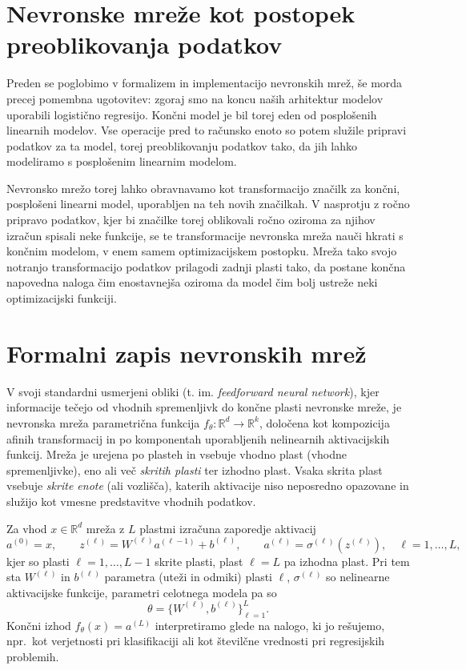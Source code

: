 \section{Nevronske mreže kot postopek preoblikovanja podatkov}

Preden se poglobimo v formalizem in implementacijo nevronskih mrež, še morda precej pomembna ugotovitev: zgoraj smo na koncu naših arhitektur modelov uporabili logistično regresijo. Končni model je bil torej eden od posplošenih linearnih modelov. Vse operacije pred to računsko enoto so potem služile pripravi podatkov za ta model, torej preoblikovanju podatkov tako, da jih lahko modeliramo s posplošenim linearnim modelom.

Nevronsko mrežo torej lahko obravnavamo kot transformacijo značilk za končni, posplošeni linearni model, uporabljen na teh novih značilkah. V nasprotju z ročno pripravo podatkov, kjer bi značilke torej oblikovali ročno oziroma za njihov izračun spisali neke funkcije, se te transformacije nevronska mreža nauči hkrati s končnim modelom, v enem samem optimizacijskem postopku. Mreža tako svojo notranjo transformacijo podatkov prilagodi zadnji plasti tako, da postane končna napovedna naloga čim enostavnejša oziroma da model čim bolj ustreže neki optimizacijski funkciji.

\section{Formalni zapis nevronskih mrež}

V svoji standardni usmerjeni obliki (t. im. {\em feedforward neural network}), kjer informacije tečejo od vhodnih spremenljivk do končne plasti nevronske mreže,
%
%
je nevronska mreža parametrična funkcija \( f_{\theta} : \mathbb{R}^d \to \mathbb{R}^k \), določena kot kompozicija afinih transformacij in po komponentah uporabljenih nelinearnih aktivacijskih funkcij. Mreža je urejena po plasteh in vsebuje vhodno plast (vhodne spremenljivke), eno ali več \emph{skritih plasti} ter izhodno plast. Vsaka skrita plast vsebuje \emph{skrite enote} (ali vozlišča), katerih aktivacije niso neposredno opazovane in služijo kot vmesne predstavitve vhodnih podatkov.

Za vhod \( x \in \mathbb{R}^d \) mreža z \(L\) plastmi izračuna zaporedje aktivacij
\[
a^{(0)} = x, \qquad 
z^{(\ell)} = W^{(\ell)} a^{(\ell-1)} + b^{(\ell)}, \qquad
a^{(\ell)} = \sigma^{(\ell)}\!\left(z^{(\ell)}\right), \quad \ell = 1, \dots, L,
\]
kjer so plasti \( \ell = 1, \dots, L-1 \) skrite plasti, plast \( \ell = L \) pa izhodna plast. Pri tem sta \( W^{(\ell)} \) in \( b^{(\ell)} \) parametra (uteži in odmiki) plasti \(\ell\), \( \sigma^{(\ell)} \) so nelinearne aktivacijske funkcije, parametri celotnega modela pa so
\[
\theta = \{W^{(\ell)}, b^{(\ell)}\}_{\ell=1}^L.
\]
Končni izhod \( f_{\theta}(x) = a^{(L)} \) interpretiramo glede na nalogo, ki jo rešujemo, npr.\ kot verjetnosti pri klasifikaciji ali kot številčne vrednosti pri regresijskih problemih.

